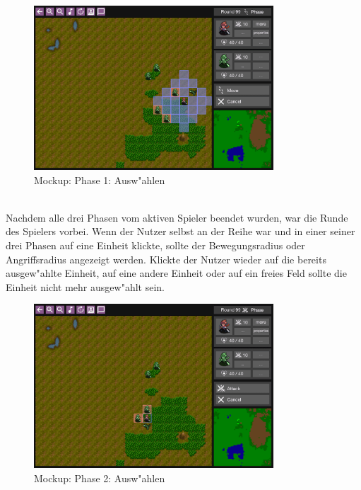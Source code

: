\documentclass[12pt, titlepage]{scrartcl}
\begin{document}
			        \begin{figure}[H] 
    				    \centering
    				    \includegraphics[width=0.8\textwidth]{images/mockups/Select.png}
    				    \caption{Mockup: Phase 1: Ausw"ahlen}
    				    \label{Select_1}
			        \end{figure}
			        \ \\ Nachdem alle drei Phasen vom aktiven Spieler beendet wurden, war die Runde des Spielers vorbei. Wenn der Nutzer selbst an der Reihe war und in einer seiner drei Phasen auf eine Einheit klickte, sollte der Bewegungsradius oder Angriffsradius angezeigt werden. Klickte der Nutzer wieder auf die bereits ausgew"ahlte Einheit, auf eine andere Einheit oder auf ein freies Feld sollte die Einheit nicht mehr ausgew"ahlt sein. \\
                    \begin{figure}[H] 
    				    \centering
    				    \includegraphics[width=0.8\textwidth]{images/mockups/Select3.png}
    				    \caption{Mockup: Phase 2: Ausw"ahlen}
    				    \label{Select_2}
			        \end{figure} 
\end{document}
